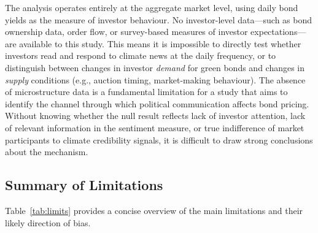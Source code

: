 \documentclass[12pt,a4paper]{article}
\begin{document}
The analysis operates entirely at the aggregate market level, using daily bond yields as the measure of investor behaviour. No investor-level data---such as bond ownership data, order flow, or survey-based measures of investor expectations---are available to this study. This means it is impossible to directly test whether investors read and respond to climate news at the daily frequency, or to distinguish between changes in investor \textit{demand} for green bonds and changes in \textit{supply} conditions (e.g., auction timing, market-making behaviour). The absence of microstructure data is a fundamental limitation for a study that aims to identify the channel through which political communication affects bond pricing. Without knowing whether the null result reflects lack of investor attention, lack of relevant information in the sentiment measure, or true indifference of market participants to climate credibility signals, it is difficult to draw strong conclusions about the mechanism.

\subsection{Summary of Limitations}

Table~\ref{tab:limits} provides a concise overview of the main limitations and their likely direction of bias.
\end{document}
